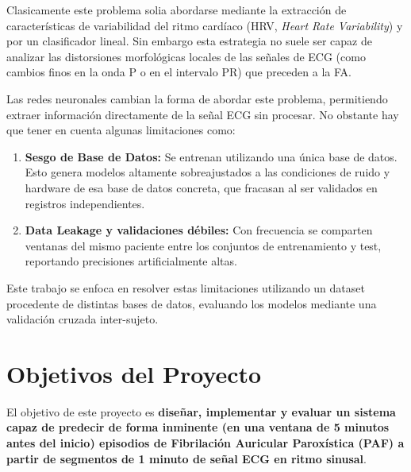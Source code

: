 Clasicamente este problema solia abordarse mediante la extracción de características de
variabilidad del ritmo cardíaco (HRV, \textit{Heart Rate Variability}) y por un clasificador lineal. Sin embargo esta
estrategia no suele ser capaz de analizar las distorsiones morfológicas locales de las señales
de ECG (como cambios finos en la onda P o en el intervalo PR) que preceden a la FA.

Las redes neuronales cambian la forma de abordar este problema, permitiendo extraer información
directamente de la señal ECG sin procesar. No obstante hay que tener en cuenta algunas limitaciones
como:

\begin{enumerate}
  \item \textbf{Sesgo de Base de Datos:} Se entrenan utilizando una única base
  de datos. Esto genera modelos altamente sobreajustados a las condiciones de ruido y
  hardware de esa base de datos concreta, que fracasan al ser validados en registros
  independientes.
  \item \textbf{Data Leakage y validaciones débiles:} Con frecuencia se comparten
  ventanas del mismo paciente entre los conjuntos de entrenamiento y test,
  reportando precisiones artificialmente altas.
\end{enumerate}

Este trabajo se enfoca en resolver estas limitaciones utilizando un dataset
procedente de distintas bases de datos, evaluando los modelos mediante una validación cruzada inter-sujeto.


\section{Objetivos del Proyecto}
\label{sec:objetivos}

El objetivo de este proyecto es
\textbf{diseñar, implementar y evaluar un sistema capaz de
predecir de forma inminente (en una ventana de 5 minutos antes del inicio) episodios de
Fibrilación Auricular Paroxística (PAF) a partir de segmentos de 1 minuto de señal ECG en
ritmo sinusal}.

